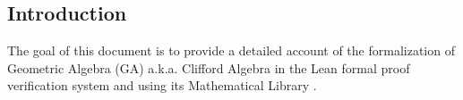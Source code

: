 \subsection*{Introduction}
\label{sec:intro}

The goal of this document is to provide a detailed account
of the formalization of Geometric Algebra (GA) a.k.a. Clifford Algebra \cite{hestenes2012clifford}
in the Lean formal proof verification system \cite{lean_2015}
and using its Mathematical Library \cite{themathlibcommunityLeanMathematicalLibrary2020}.
